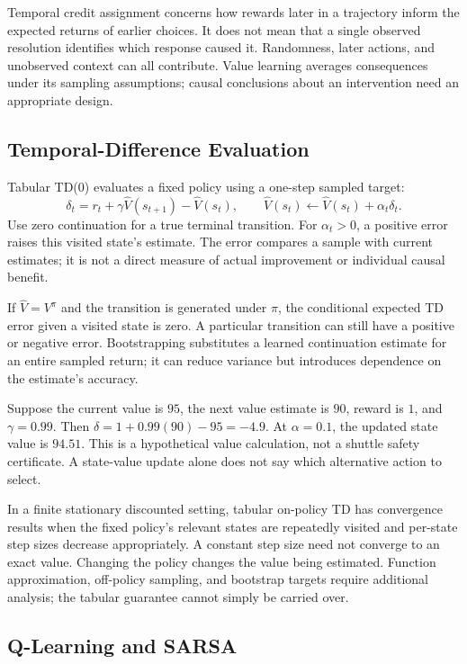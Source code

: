 Temporal credit assignment concerns how rewards later in a trajectory inform the expected returns of earlier choices. It does not mean that a single observed resolution identifies which response caused it. Randomness, later actions, and unobserved context can all contribute. Value learning averages consequences under its sampling assumptions; causal conclusions about an intervention need an appropriate design.

\subsection{Temporal-Difference Evaluation}

Tabular TD(0) evaluates a fixed policy using a one-step sampled target:
\[
\delta_t=r_t+\gamma\hat V(s_{t+1})-\hat V(s_t),
\qquad
\hat V(s_t)\leftarrow\hat V(s_t)+\alpha_t\delta_t.
\]
Use zero continuation for a true terminal transition. For $\alpha_t>0$, a positive error raises this visited state's estimate. The error compares a sample with current estimates; it is not a direct measure of actual improvement or individual causal benefit.

If $\hat V=V^\pi$ and the transition is generated under $\pi$, the conditional expected TD error given a visited state is zero. A particular transition can still have a positive or negative error. Bootstrapping substitutes a learned continuation estimate for an entire sampled return; it can reduce variance but introduces dependence on the estimate's accuracy.

Suppose the current value is $95$, the next value estimate is $90$, reward is $1$, and $\gamma=0.99$. Then $\delta=1+0.99(90)-95=-4.9$. At $\alpha=0.1$, the updated state value is $94.51$. This is a hypothetical value calculation, not a shuttle safety certificate. A state-value update alone does not say which alternative action to select.

In a finite stationary discounted setting, tabular on-policy TD has convergence results when the fixed policy's relevant states are repeatedly visited and per-state step sizes decrease appropriately. A constant step size need not converge to an exact value. Changing the policy changes the value being estimated. Function approximation, off-policy sampling, and bootstrap targets require additional analysis; the tabular guarantee cannot simply be carried over.

\subsection{Q-Learning and SARSA}

